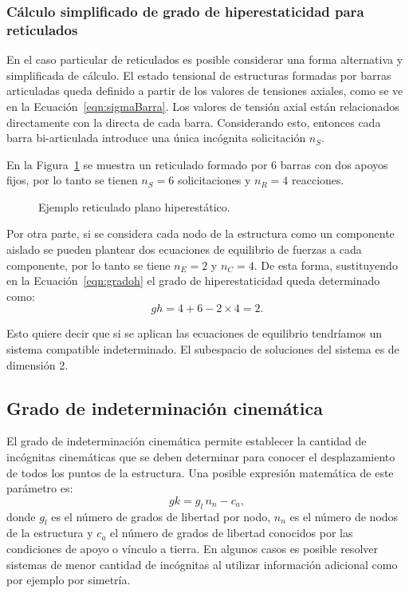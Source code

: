 \subsubsection{Cálculo simplificado de grado de hiperestaticidad para reticulados}

En el caso particular de reticulados es posible considerar una forma alternativa y simplificada de cálculo. %
% 
El estado tensional de estructuras formadas por barras articuladas queda definido a partir de los valores de tensiones axiales, como se ve en la Ecuación~\ref{eqn:sigmaBarra}. %
%
Los valores de tensión axial están relacionados directamente con la directa de cada barra. %
%
Considerando esto, entonces cada barra bi-articulada introduce una única incógnita solicitación $n_S$.

En la Figura~\ref{fig:retic_gh} se muestra un reticulado formado por 6 barras con dos apoyos fijos, por lo tanto se tienen $n_S=6$ solicitaciones y $n_R=4$ reacciones. %

\begin{figure}[htb]
	\centering
	\def\svgwidth{0.6\textwidth}
	
	\caption{Ejemplo reticulado plano hiperestático.}
	\label{fig:retic_gh}
\end{figure}

Por otra parte, si se considera cada nodo de la estructura como un componente aislado se pueden plantear dos ecuaciones de equilibrio de fuerzas a cada componente, por lo tanto se tiene $n_E = 2$ y $n_C =4$. %
%
De esta forma, sustituyendo en la Ecuación~\ref{eqn:gradoh} el grado de hiperestaticidad queda determinado como:
%
\begin{equation}
gh = 4 + 6 - 2 \times 4 = 2.
\end{equation}

Esto quiere decir que si se aplican las ecuaciones de equilibrio tendríamos un sistema compatible indeterminado. El subespacio de soluciones del sistema es de dimensión 2.




\subsection{Grado de indeterminación cinemática}

El grado de indeterminación cinemática permite establecer la cantidad de incógnitas cinemáticas que se deben determinar para conocer el desplazamiento de todos los puntos de la estructura.
%
Una posible expresión matemática de este parámetro es:
%
\begin{equation}
gk = g_l \, n_n - c_a,
\end{equation}
%
donde $g_l$ es el número de grados de libertad por nodo, $n_n$ es el número de nodos de la estructura y $c_a$ el número de grados de libertad conocidos por las condiciones de apoyo o vínculo a tierra. %
%
En algunos casos es posible resolver sistemas de menor cantidad de incógnitas al utilizar información adicional como por ejemplo por simetría.


